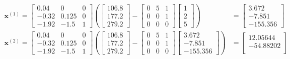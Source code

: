 \documentclass[]{article}
\begin{document}
\begin{align*}
    \mathbf{x}^{(1)} = \begin{bmatrix}
        0.04 & 0 & 0\\
        -0.32 & 0.125 & 0\\
        -1.92 & -1.5 & 1
    \end{bmatrix} \left(\begin{bmatrix}
        106.8\\
        177.2\\
        279.2
    \end{bmatrix} - \begin{bmatrix}
        0 & 5 & 1\\
        0 & 0 & 1\\
        0 & 0 & 0
    \end{bmatrix}\begin{bmatrix}
        1\\
        2\\
        5
    \end{bmatrix}\right)
    &=
    \begin{bmatrix}
        3.672\\
        -7.851\\
        -155.356
    \end{bmatrix}\\
    \mathbf{x}^{(2)} = \begin{bmatrix}
        0.04 & 0 & 0\\
        -0.32 & 0.125 & 0\\
        -1.92 & -1.5 & 1
    \end{bmatrix} \left(\begin{bmatrix}
        106.8\\
        177.2\\
        279.2
    \end{bmatrix} - \begin{bmatrix}
        0 & 5 & 1\\
        0 & 0 & 1\\
        0 & 0 & 0
    \end{bmatrix}\begin{bmatrix}
        3.672\\
        -7.851\\
        -155.356
    \end{bmatrix}\right)
    &=
    \begin{bmatrix}
        12.05644\\
        -54.88202\\

\end{bmatrix}
\end{align*}
\end{document}
